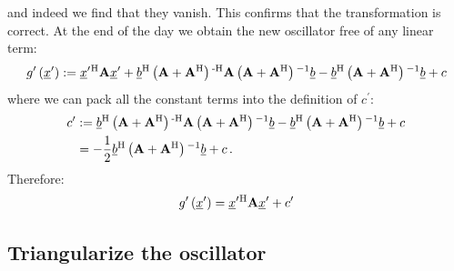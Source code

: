 \documentclass[a4paper,10pt]{article}
\begin{document}
and indeed we find that they vanish. This confirms that the
transformation is correct. At the end of the day we obtain the
new oscillator free of any linear term:
\begin{equation}
  g^{\prime}\left(\underline{x}^{\prime}\right) :=
  \underline{x}^{\prime}{}^{\textnormal{H}} \mathbf{A} \underline{x}^{\prime}
  + \underline{b}{}^{\textnormal{H}} \left(\mathbf{A} + \mathbf{A}{}^{\textnormal{H}}\right){}^{\textnormal{-H}} \mathbf{A} \left(\mathbf{A} + \mathbf{A}{}^{\textnormal{H}}\right){}^{-1} \underline{b}
  - \underline{b}{}^{\textnormal{H}} \left(\mathbf{A} + \mathbf{A}{}^{\textnormal{H}}\right){}^{-1} \underline{b}
  + c
\end{equation}
where we can pack all the constant terms into the definition of $c^{\prime}$:
\begin{equation}
\begin{split}
  c^{\prime} & :=
               \underline{b}{}^{\textnormal{H}} \left(\mathbf{A} + \mathbf{A}{}^{\textnormal{H}}\right){}^{\textnormal{-H}} \mathbf{A} \left(\mathbf{A} + \mathbf{A}{}^{\textnormal{H}}\right){}^{-1} \underline{b}
             - \underline{b}{}^{\textnormal{H}} \left(\mathbf{A} + \mathbf{A}{}^{\textnormal{H}}\right){}^{-1} \underline{b}
             + c \\
             & =
             -\frac{1}{2} \underline{b}{}^{\textnormal{H}} \left(\mathbf{A} + \mathbf{A}{}^{\textnormal{H}}\right){}^{-1} \underline{b} + c \,.
\end{split}
\end{equation}
Therefore:
\begin{equation} \label{eq:linearless_operator}
  g^{\prime}\left(\underline{x}^{\prime}\right) = \underline{x}^{\prime}{}^{\textnormal{H}} \mathbf{A} \underline{x}^{\prime}
                                            + c^{\prime}
\end{equation}


\subsection{Triangularize the oscillator}
\end{document}
